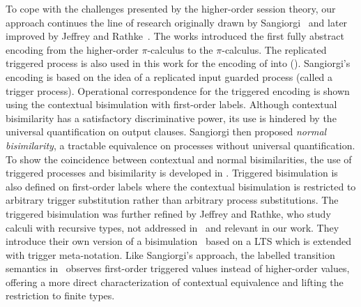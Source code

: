 To cope with the challenges presented by the higher-order
session theory, 
our approach continues the line of research 
originally drawn by Sangiorgi~\cite{San96H,SangiorgiD:expmpa}
and later improved by Jeffrey and Rathke~\cite{JeffreyR05}.
The works %
\cite{San96H,SangiorgiD:expmpa}
introduced the first fully abstract encoding from the higher-order 
$\pi$-calculus to the $\pi$-calculus. 
The replicated triggered process 
is also used in this work for the encoding of \HOp into \sessp ().
Sangiorgi's encoding is based on the idea of a replicated input guarded process 
(called a trigger process). Operational correspondence for
the triggered encoding is shown using the contextual bisimulation
with first-order labels.
Although contextual bisimilarity has a satisfactory discriminative power,
its use is hindered by the universal quantification on output clauses.
Sangiorgi then proposed \emph{normal bisimilarity}, a tractable  equivalence 
on processes without universal quantification. 
To show the coincidence between contextual and normal bisimilarities, 
the use of triggered processes and bisimilarity is developed in \cite{San96H}.
Triggered bisimulation is also defined on first-order labels
where the contextual bisimulation is restricted to arbitrary
trigger substitution rather than arbitrary process substitutions.
The triggered bisimulation was further refined by Jeffrey and
Rathke, who study calculi with recursive types, not addressed in~\cite{San96H,SangiorgiD:expmpa} and
relevant in our work.
They introduce their own version of a
bisimulation~\cite{JeffreyR05}
based on a LTS which is extended with trigger meta-notation.
Like Sangiorgi's approach, the labelled transition semantics
in~\cite{JeffreyR05}
observes first-order triggered values instead of
higher-order values, offering a more direct characterization of contextual equivalence
and lifting the restriction to finite types.



